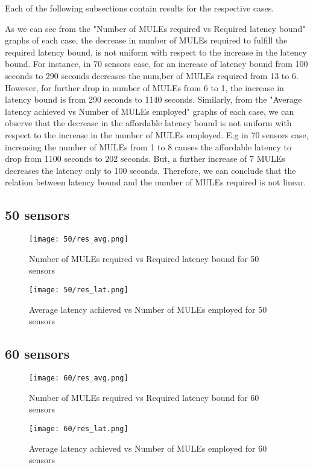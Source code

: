 Each of the following subsections contain results for the respective cases.

As we can see from the "Number of MULEs required vs Required latency bound" graphs of each case, the decrease in number of MULEs required to fulfill the required latency bound, is not uniform with respect to the increase in the latency bound. For instance, in 70 sensors case, for an increase of latency bound from 100 seconds to 290 seconds decreases the num,ber of MULEs required from 13 to 6. However, for further drop in number of MULEs from 6 to 1, the increase in latency bound is from 290 seconds to 1140 seconds. Similarly, from the "Average latency achieved vs Number of MULEs employed" graphs of each case, we can observe that the decrease in the affordable latency bound is not uniform with respect to the increase in the number of MULEs employed. E.g in 70 sensors case, increasing the number of MULEs from 1 to 8 causes the affordable latency to drop from 1100 seconds to 202 seconds. But, a further increase of 7 MULEs decreases the latency only to 100 seconds. Therefore, we can conclude that the relation between latency bound and the number of MULEs required is not linear.

\pagebreak

\subsection{50 sensors}
\begin{figure}[H]
\texttt{[image: 50/res\_avg.png]}
\caption{Number of MULEs required vs Required latency bound for 50 sensors}
\end{figure}
\begin{figure}[H]
\texttt{[image: 50/res\_lat.png]}
\caption{Average latency achieved vs Number of MULEs employed for 50 sensors}
\end{figure}
\subsection{60 sensors}
\begin{figure}[H]
\texttt{[image: 60/res\_avg.png]}
\caption{Number of MULEs required vs Required latency bound for 60 sensors}
\end{figure}
\begin{figure}[H]
\texttt{[image: 60/res\_lat.png]}
\caption{Average latency achieved vs Number of MULEs employed for 60 sensors}
\end{figure}

